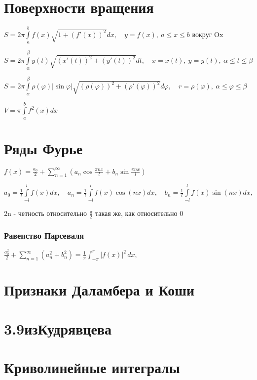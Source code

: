 \section{Поверхности вращения}

$S=2\pi \int \limits _{a}^{b}f(x){\sqrt  {1+\left(f'(x)\right)^{2}}}dx, \quad y=f(x),\ a\leq x\leq b$ вокруг Ox

$S=2\pi \int \limits _{\alpha }^{\beta }y(t){\sqrt  {\left(x'(t)\right)^{2}+\left(y'(t)\right)^{2}}}dt, \quad x=x(t),\ y=y(t),\ \alpha \leq t\leq \beta  $

$S=2\pi \int \limits _{\alpha }^{\beta }\rho (\varphi )|\sin \varphi |{\sqrt  {\left(\rho (\varphi )\right)^{2}+\left(\rho '(\varphi )\right)^{2}}}d\varphi, \quad r=\rho (\varphi ),\ \alpha \leq \varphi \leq \beta $

$V=\pi \int \limits _{a}^{b}f^{2}(x)dx$


\section{Ряды Фурье}

$f(x)=\frac{a_0}{2} + \sum^{\infty}_{n=1} (a_n \cos \frac{\pi n x}{l} + b_n \sin \frac{\pi n x}{l})$

$a_0= \frac{1}{l}\int\limits_{-l}^{l}f(x)dx, \quad a_n= \frac{1}{l}\int\limits_{-l}^{l}f(x)\cos(nx)dx, \quad b_n= \frac{1}{l}\int\limits_{-l}^{l}f(x)\sin(nx)dx,$

2n - четность относительно $\frac {\pi}{2}$ такая же, как относительно 0

\subsubsection{Равенство Парсеваля} 
$\frac {a_0^2}{2} + \sum _{{n=1}}^{\infty }(a_n^2 +b_n^2)={\frac  {1}{\pi }}\int _{{-\pi }}^{\pi }|f(x)|^{2}\,dx,$

\section{Признаки Даламбера и Коши}

\section{3.9изКудрявцева}

\section{Криволинейные интегралы}
